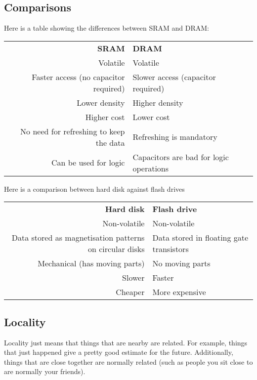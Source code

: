 \documentclass[11pt,a4paper,titlepage,dvipsnames,cmyk]{scrartcl}
\begin{document}
\subsection{Comparisons}%
\label{sub:SRAM vs DRAM}
Here is a table showing the differences between SRAM and DRAM:

\begin{center}
    \begin{tabular}{r|l}
        \textbf{SRAM} & \textbf{DRAM} \\ \hhline{=|=}
        Volatile & Volatile \\ 
        Faster access (no capacitor required) & Slower access (capacitor
        required) \\ 
        Lower density & Higher density \\ 
        Higher cost & Lower cost \\ 
        No need for refreshing to keep the data & Refreshing is mandatory
        \\ 
        Can be used for logic & Capacitors are bad for logic operations
    \end{tabular}
\end{center}

Here is a comparison between hard disk against flash drives

\begin{center}
    \begin{tabular}{r|l}
        \textbf{Hard disk} & \textbf{Flash drive} \\ \hhline{=|=}
        Non-volatile & Non-volatile \\
        Data stored as magnetisation patterns on circular disks & Data
        stored in floating gate transistors \\
        Mechanical (has moving parts) & No moving parts \\
        Slower & Faster \\
        Cheaper & More expensive
    \end{tabular}
\end{center}

\subsection{Locality}%
\label{sub:Locality}
Locality just means that things that are nearby are related. For example,
things that just happened give a pretty good estimate for the future.
Additionally, things that are close together are normally related (such as
people you sit close to are normally your friends).
\end{document}
